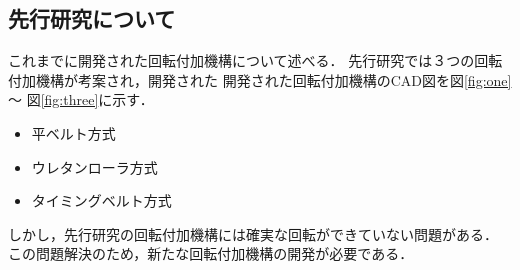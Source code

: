 \documentclass{classes/sice-si}
\begin{document}
\subsection{先行研究について}
これまでに開発された回転付加機構について述べる．
先行研究では３つの回転付加機構が考案され，開発された
開発された回転付加機構のCAD図を図\ref{fig:one} ～ 図\ref{fig:three}に示す．
\begin{itemize}
    \item 平ベルト方式  \cite{ref:sankou}
    \item ウレタンローラ方式 
    \item タイミングベルト方式 
\end{itemize}
しかし，先行研究の回転付加機構には確実な回転ができていない問題がある．
この問題解決のため，新たな回転付加機構の開発が必要である．
\end{document}
